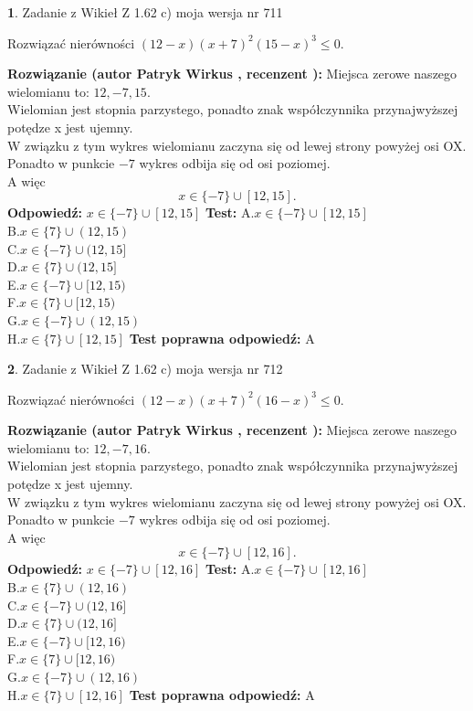 \documentclass[12pt, a4paper]{article}
\theoremstyle{definition} %
\newtheorem{zad}{}
\newcommand{\zadStart}[1]{\begin{zad}#1\newline}
\newcommand{\zadStop}{\end{zad}}
\newcommand{\rozwStart}[2]{\noindent \textbf{Rozwiązanie (autor #1 , recenzent #2): }\newline}
\newcommand{\rozwStop}{\newline}
\newcommand{\odpStart}{\noindent \textbf{Odpowiedź:}\newline}
\newcommand{\odpStop}{\newline}
\newcommand{\testStart}{\noindent \textbf{Test:}\newline}
\newcommand{\testStop}{\newline}
\newcommand{\kluczStart}{\noindent \textbf{Test poprawna odpowiedź:}\newline}
\newcommand{\kluczStop}{\newline}
\begin{document}
\zadStart{Zadanie z Wikieł Z 1.62 c) moja wersja nr 711}

Rozwiązać nierówności $(12-x)(x+7)^{2}(15-x)^{3}\le0$.
\zadStop
\rozwStart{Patryk Wirkus}{}
Miejsca zerowe naszego wielomianu to: $12, -7, 15$.\\
Wielomian jest stopnia parzystego, ponadto znak współczynnika przy\linebreak najwyższej potędze x jest ujemny.\\ W związku z tym wykres wielomianu zaczyna się od lewej strony powyżej osi OX.\\
Ponadto w punkcie $-7$ wykres odbija się od osi poziomej.\\
A więc $$x \in \{-7\} \cup [12,15].$$
\rozwStop
\odpStart
$x \in \{-7\} \cup [12,15]$
\odpStop
\testStart
A.$x \in \{-7\} \cup [12,15]$\\
B.$x \in \{7\} \cup (12,15)$\\
C.$x \in \{-7\} \cup (12,15]$\\
D.$x \in \{7\} \cup (12,15]$\\
E.$x \in \{-7\} \cup [12,15)$\\
F.$x \in \{7\} \cup [12,15)$\\
G.$x \in \{-7\} \cup (12,15)$\\
H.$x \in \{7\} \cup [12,15]$
\testStop
\kluczStart
A
\kluczStop



\zadStart{Zadanie z Wikieł Z 1.62 c) moja wersja nr 712}

Rozwiązać nierówności $(12-x)(x+7)^{2}(16-x)^{3}\le0$.
\zadStop
\rozwStart{Patryk Wirkus}{}
Miejsca zerowe naszego wielomianu to: $12, -7, 16$.\\
Wielomian jest stopnia parzystego, ponadto znak współczynnika przy\linebreak najwyższej potędze x jest ujemny.\\ W związku z tym wykres wielomianu zaczyna się od lewej strony powyżej osi OX.\\
Ponadto w punkcie $-7$ wykres odbija się od osi poziomej.\\
A więc $$x \in \{-7\} \cup [12,16].$$
\rozwStop
\odpStart
$x \in \{-7\} \cup [12,16]$
\odpStop
\testStart
A.$x \in \{-7\} \cup [12,16]$\\
B.$x \in \{7\} \cup (12,16)$\\
C.$x \in \{-7\} \cup (12,16]$\\
D.$x \in \{7\} \cup (12,16]$\\
E.$x \in \{-7\} \cup [12,16)$\\
F.$x \in \{7\} \cup [12,16)$\\
G.$x \in \{-7\} \cup (12,16)$\\
H.$x \in \{7\} \cup [12,16]$
\testStop
\kluczStart
A
\kluczStop
\end{document}
